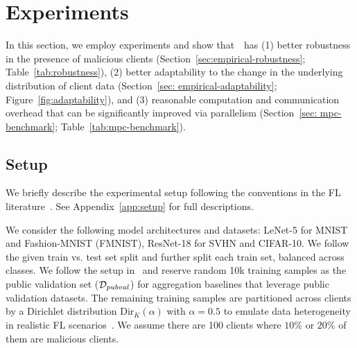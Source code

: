 \section{Experiments}
\label{sec:experiment}



In this section, we employ experiments and show that~\ours~has (1) better robustness in the presence of malicious clients (Section~\ref{sec:empirical-robustness}; Table~\ref{tab:robustness}), (2) better adaptability to the change in the underlying distribution of client data (Section~\ref{sec: empirical-adaptability}; Figure~\ref{fig:adaptability}), and (3) reasonable computation and communication overhead that can be significantly improved via parallelism (Section~\ref{sec: mpc-benchmark}; Table~\ref{tab:mpc-benchmark}).



\subsection{Setup}
\label{sec:exp-setup}

We briefly describe the experimental setup following the conventions in the FL literature~\cite{fang2020local,CCS:CGJv22}.
See Appendix~\ref{app:setup} for full descriptions.

 We consider the following model architectures and datasets: LeNet-5 for MNIST and Fashion-MNIST (FMNIST), ResNet-18 for SVHN and CIFAR-10.
We follow the given train vs. test set split and further split each train set, balanced across classes. We follow the setup in~\cite{CCS:CGJv22} and reserve random 10k training samples as the public validation set ($\mathcal{D}_{pubval}$) for aggregation baselines that leverage public validation datasets. The remaining training samples are partitioned across clients by a Dirichlet distribution $\text{Dir}_K(\alpha)$ with $\alpha = 0.5$ to emulate data heterogeneity in realistic FL scenarios~\cite{cao2020fltrust}.
We assume there are 100 clients where $10\%$ or $20\%$ of them are malicious clients.



